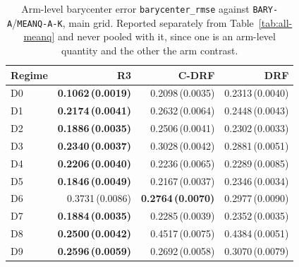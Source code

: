 \begin{table}[htbp]
\centering
\caption{Arm-level barycenter error \texttt{barycenter\_rmse} against \texttt{BARY-A}/\texttt{MEANQ-A-K}, main grid. Reported separately from Table~\ref{tab:all-meanq} and never pooled with it, since one is an arm-level quantity and the other the arm contrast.}
\label{tab:all-bary}
\scriptsize
\setlength{\tabcolsep}{3.2pt}
\begin{tabular}{@{}lrrr@{}}
\toprule
Regime & R3 & C-DRF & DRF \\
\midrule
D0 & \textbf{0.1062\,(0.0019)} & 0.2098\,(0.0035) & 0.2313\,(0.0040) \\
D1 & \textbf{0.2174\,(0.0041)} & 0.2632\,(0.0064) & 0.2448\,(0.0043) \\
D2 & \textbf{0.1886\,(0.0035)} & 0.2506\,(0.0041) & 0.2302\,(0.0033) \\
D3 & \textbf{0.2340\,(0.0037)} & 0.3028\,(0.0042) & 0.2881\,(0.0051) \\
D4 & \textbf{0.2206\,(0.0040)} & 0.2236\,(0.0065) & 0.2289\,(0.0085) \\
D5 & \textbf{0.1846\,(0.0049)} & 0.2167\,(0.0037) & 0.2346\,(0.0034) \\
D6 & 0.3731\,(0.0086) & \textbf{0.2764\,(0.0070)} & 0.2977\,(0.0090) \\
D7 & \textbf{0.1884\,(0.0035)} & 0.2285\,(0.0039) & 0.2352\,(0.0035) \\
D8 & \textbf{0.2500\,(0.0042)} & 0.4517\,(0.0075) & 0.4384\,(0.0051) \\
D9 & \textbf{0.2596\,(0.0059)} & 0.2692\,(0.0058) & 0.3070\,(0.0079) \\
\bottomrule
\end{tabular}
\end{table}

